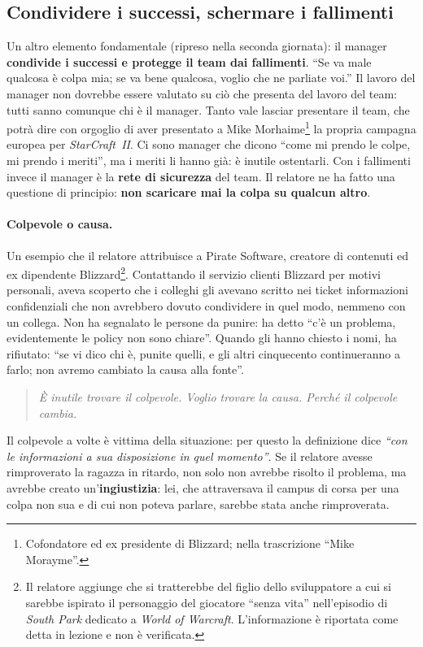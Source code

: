 \subsection{Condividere i successi, schermare i fallimenti}

Un altro elemento fondamentale (ripreso nella seconda giornata): il manager
\textbf{condivide i successi e protegge il team dai fallimenti}. ``Se va male
qualcosa è colpa mia; se va bene qualcosa, voglio che ne parliate voi.'' Il
lavoro del manager non dovrebbe essere valutato su ciò che presenta del lavoro
del team: tutti sanno comunque chi è il manager. Tanto vale lasciar presentare
il team, che potrà dire con orgoglio di aver presentato a Mike
Morhaime\footnote{Cofondatore ed ex presidente di Blizzard; nella
trascrizione ``Mike Morayme''.} la propria campagna europea per
\emph{StarCraft~II}. Ci sono manager che dicono ``come mi prendo le colpe, mi
prendo i meriti'', ma i meriti li hanno già: è inutile ostentarli. Con i
fallimenti invece il manager è la \textbf{rete di sicurezza} del team. Il
relatore ne ha fatto una questione di principio: \textbf{non scaricare mai la
colpa su qualcun altro}.

\paragraph{Colpevole o causa.} Un esempio che il relatore attribuisce a Pirate
Software, creatore di contenuti ed ex dipendente Blizzard\footnote{Il relatore
aggiunge che si tratterebbe del figlio dello sviluppatore a cui si sarebbe
ispirato il personaggio del giocatore ``senza vita'' nell'episodio di
\emph{South Park} dedicato a \emph{World of Warcraft}. L'informazione è
riportata come detta in lezione e non è verificata.}. Contattando il servizio
clienti Blizzard per motivi personali, aveva scoperto che i colleghi gli
avevano scritto nei ticket informazioni confidenziali che non avrebbero dovuto
condividere in quel modo, nemmeno con un collega. Non ha segnalato le persone
da punire: ha detto ``c'è un problema, evidentemente le policy non sono
chiare''. Quando gli hanno chiesto i nomi, ha rifiutato: ``se vi dico chi è,
punite quelli, e gli altri cinquecento continueranno a farlo; non avremo
cambiato la causa alla fonte''.

\begin{quote}
  \emph{È inutile trovare il colpevole. Voglio trovare la causa. Perché il
  colpevole cambia.}
\end{quote}

Il colpevole a volte è vittima della situazione: per questo la definizione
dice \emph{``con le informazioni a sua disposizione in quel momento''}. Se il
relatore avesse rimproverato la ragazza in ritardo, non solo non avrebbe
risolto il problema, ma avrebbe creato un'\textbf{ingiustizia}: lei, che
attraversava il campus di corsa per una colpa non sua e di cui non poteva
parlare, sarebbe stata anche rimproverata.

